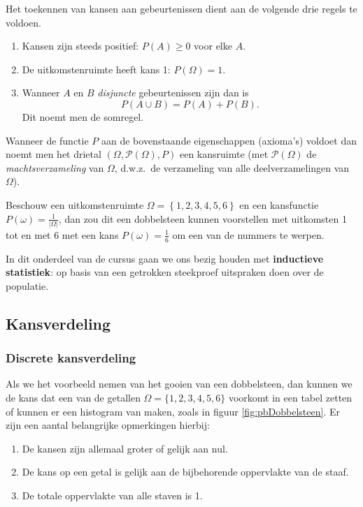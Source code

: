 \begin{definition}[Kansruimte]
Het toekennen van kansen aan gebeurtenissen dient aan de volgende drie regels te voldoen.
\begin{enumerate}
\item Kansen zijn steeds positief:
 $P(A) \geq 0$ voor elke $A$.
  \item
  De uitkomstenruimte heeft kans 1:
  $P(\Omega) = 1.$
 \item Wanneer $A$ en $B$ \emph{disjuncte}\/ gebeurtenissen zijn dan is
 \[P(A\cup B) = P(A) + P(B). \]
 Dit noemt men de somregel.
\end{enumerate}
Wanneer de functie $P$ aan de bovenstaande eigenschappen (axioma's) voldoet
dan noemt men het drietal $(\Omega, \mathcal{P}(\Omega), P)$ een
kansruimte (met $\mathcal{P}(\Omega)$ de \emph{machtsverzameling} van $\Omega$, d.w.z.~de verzameling van alle deelverzamelingen van $\Omega$).
\end{definition}

\begin{example}
Beschouw een uitkomstenruimte $\Omega =  \left\{ 1,2,3,4,5,6 \right\} $ en
een kansfunctie $P(\omega)=\frac{1}{|\Omega|}$, dan zou dit een dobbelsteen
kunnen voorstellen met uitkomsten 1 tot en met 6 met een kans
$P(\omega) = \frac{1}{6}$ om een van de nummers te werpen.
\end{example}

In dit onderdeel van de  cursus gaan we ons bezig houden met \textbf{inductieve statistiek}: op basis van een getrokken steekproef uitspraken doen over de populatie.

\subsection{Kansverdeling}

\subsubsection{Discrete kansverdeling}

Als we het voorbeeld nemen van het gooien van een dobbelsteen, dan kunnen we de kans dat een van de getallen $\Omega = \{1,2,3,4,5,6\}$ voorkomt in een tabel zetten of kunnen er een histogram van maken, zoals in figuur \ref{fig:pbDobbelsteen}.  Er zijn een aantal belangrijke opmerkingen hierbij:

\begin{enumerate}
  \item De kansen zijn allemaal groter of gelijk aan nul.
  \item De kans op een getal is gelijk aan de bijbehorende oppervlakte van de staaf.
  \item De totale oppervlakte van alle staven is 1.
\end{enumerate}

